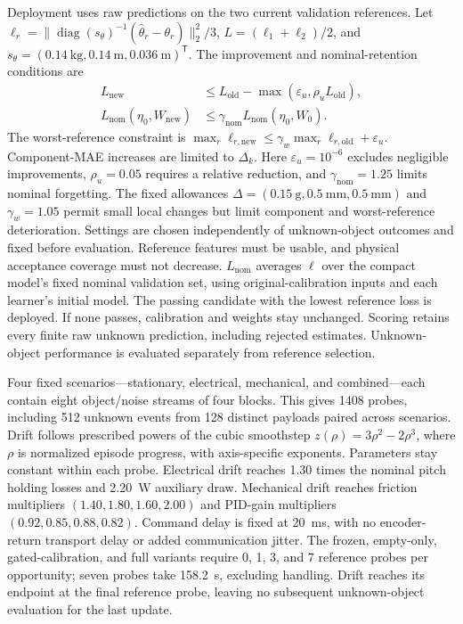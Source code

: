\documentclass[12pt,a4paper]{article}
\begin{document}
Deployment uses raw predictions on the two current validation references.
Let $\ell_r=\|\operatorname{diag}(s_\theta)^{-1}
(\hat\theta_r-\theta_r)\|_2^2/3$, $L=(\ell_1+\ell_2)/2$, and
$s_\theta=(0.14~\mathrm{kg},0.14~\mathrm m,0.036~\mathrm m)^{\mathsf T}$.
The improvement and nominal-retention conditions are
\begin{equation}
\begin{aligned}
 L_{\mathrm{new}}&\leq L_{\mathrm{old}}-
       \max(\varepsilon_u,\rho_u L_{\mathrm{old}}),\\
 L_{\mathrm{nom}}(\eta_0,W_{\mathrm{new}})&\leq
       \gamma_{\mathrm{nom}}L_{\mathrm{nom}}(\eta_0,W_0).
\end{aligned}
\label{eq:adaptation_gate}
\end{equation}
The worst-reference constraint is
$\max_r\ell_{r,\mathrm{new}}\leq\allowbreak
\gamma_w\max_r\ell_{r,\mathrm{old}}+\varepsilon_u$.
Component-MAE increases are limited to $\Delta_k$.
Here $\varepsilon_u=10^{-6}$ excludes negligible improvements,
$\rho_u=0.05$ requires a relative reduction, and
$\gamma_{\mathrm{nom}}=1.25$ limits nominal forgetting. The fixed
allowances $\Delta=(0.15~\mathrm g,0.5~\mathrm{mm},0.5~\mathrm{mm})$
and $\gamma_w=1.05$ permit small local changes but limit component and
worst-reference deterioration. Settings are chosen independently of
unknown-object outcomes and fixed before evaluation. Reference features
must be usable, and physical acceptance coverage must not decrease.
$L_{\mathrm{nom}}$ averages $\ell$ over the compact model's fixed nominal
validation set, using original-calibration inputs and each learner's
initial model. The passing candidate with the lowest reference loss is
deployed. If none passes, calibration and weights stay unchanged. Scoring
retains every finite raw unknown prediction, including rejected estimates.
Unknown-object performance is evaluated separately from reference selection.

Four fixed scenarios---stationary, electrical, mechanical, and
combined---each contain eight object/noise streams of four blocks. This
gives 1408 probes, including 512 unknown events from 128 distinct payloads
paired across scenarios. Drift follows prescribed powers of the cubic
smoothstep $z(\rho)=3\rho^2-2\rho^3$, where $\rho$ is normalized episode
progress, with axis-specific exponents. Parameters stay constant within
each probe. Electrical drift reaches 1.30 times the nominal pitch holding
losses and 2.20~W auxiliary draw. Mechanical drift reaches friction
multipliers $(1.40,1.80,1.60,2.00)$ and PID-gain multipliers
$(0.92,0.85,0.88,0.82)$. Command delay is fixed at 20~ms, with no
encoder-return transport delay or added communication jitter. The frozen,
empty-only, gated-calibration, and full variants require 0, 1, 3, and 7
reference probes per opportunity; seven probes take 158.2~s, excluding
handling. Drift reaches its endpoint at the final reference probe, leaving
no subsequent unknown-object evaluation for the last update.
\end{document}
